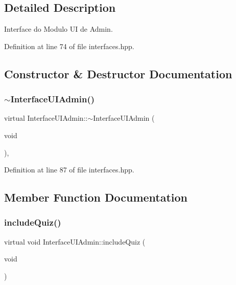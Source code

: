 \subsection{Detailed Description}
Interface do Modulo UI de Admin. 

Definition at line 74 of file interfaces.\+hpp.



\subsection{Constructor \& Destructor Documentation}
\mbox{\label{class_interface_u_i_admin_aa2a6ef48ec075bfa3ba5006ac6c1dfe9}} 
\subsubsection{\texorpdfstring{$\sim$\+Interface\+U\+I\+Admin()}{~InterfaceUIAdmin()}}
{\footnotesize\ttfamily virtual Interface\+U\+I\+Admin\+::$\sim$\+Interface\+U\+I\+Admin (\begin{DoxyParamCaption}\item[{void}]{ }\end{DoxyParamCaption})\hspace{0.3cm}{\ttfamily [inline]}, {\ttfamily [virtual]}}



Definition at line 87 of file interfaces.\+hpp.



\subsection{Member Function Documentation}
\mbox{\label{class_interface_u_i_admin_a7a7964eb3ed3e6d4825d783433c9c7f1}} 
\subsubsection{\texorpdfstring{include\+Quiz()}{includeQuiz()}}
{\footnotesize\ttfamily virtual void Interface\+U\+I\+Admin\+::include\+Quiz (\begin{DoxyParamCaption}\item[{void}]{ }\end{DoxyParamCaption})\hspace{0.3cm}{\ttfamily [pure virtual]}}




